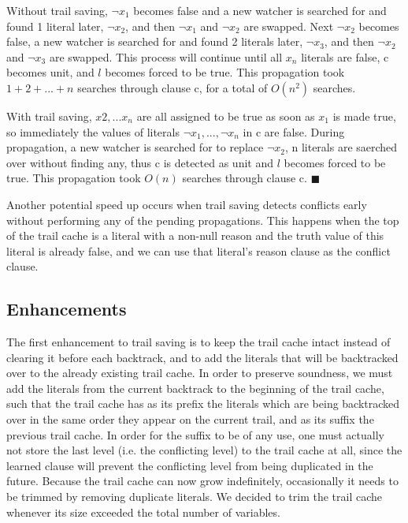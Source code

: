 \documentclass{article}
\begin{document}
Without trail saving, $\lnot x_1$ becomes false and a new watcher is searched for and found 1 literal later, $\lnot x_2$, and then $\lnot x_1$ and $\lnot x_2$ are swapped. Next $\lnot x_2$ becomes false, a new watcher is searched for and found 2 literals later, $\lnot x_3$, and then $\lnot x_2$ and $\lnot x_3$ are swapped. This process will continue until all $x_n$ literals are false, c becomes unit, and $l$ becomes forced to be true. This propagation took $1 + 2 + ... + n$ searches through clause c, for a total of $O(n^2)$ searches.

With trail saving, $x2, ... x_n$ are all assigned to be true as soon as $x_1$ is made true, so immediately the values of literals $\lnot x_1, ..., \lnot x_n$ in c are false. During propagation, a new watcher is searched for to replace $\lnot x_2$, n literals are saerched over without finding any, thus c is detected as unit and $l$ becomes forced to be true. This propagation took $O(n)$ searches through clause c. $\blacksquare$\newline

Another potential speed up occurs when trail saving detects conflicts early without performing any of the pending propagations. This happens when the top of the trail cache is a literal with a non-null reason and the truth value of this literal is already false, and we can use that literal's reason clause as the conflict clause.

\subsection{Enhancements}

The first enhancement to trail saving is to keep the trail cache intact instead of clearing it before each backtrack, and to add the literals that will be backtracked over to the already existing trail cache. In order to preserve soundness, we must add the literals from the current backtrack to the beginning of the trail cache, such that the trail cache has as its prefix the literals which are being backtracked over in the same order they appear on the current trail, and as its suffix the previous trail cache. In order for the suffix to be of any use, one must actually not store the last level (i.e. the conflicting level) to the trail cache at all, since the learned clause will prevent the conflicting level from being duplicated in the future. Because the trail cache can now grow indefinitely, occasionally it needs to be trimmed by removing duplicate literals. We decided to trim the trail cache whenever its size exceeded the total number of variables.
\end{document}
